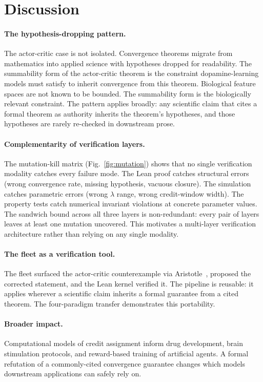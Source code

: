 \FloatBarrier
\section{Discussion}
\label{sec:discussion}

\paragraph{The hypothesis-dropping pattern.}
The actor-critic case is not isolated. Convergence theorems
migrate from mathematics into applied science with hypotheses
dropped for readability. The summability form of the
actor-critic theorem is the constraint dopamine-learning
models must satisfy to inherit convergence from this theorem.
Biological feature spaces are not known to be bounded.
The summability form is the biologically relevant constraint. The
pattern applies broadly: any scientific claim that cites a
formal theorem as authority inherits the theorem's hypotheses,
and those hypotheses are rarely re-checked in downstream prose.

\paragraph{Complementarity of verification layers.}
The mutation-kill matrix (Fig.~\ref{fig:mutation}) shows that no
single verification modality catches every failure mode. The Lean
proof catches structural errors (wrong convergence rate, missing
hypothesis, vacuous closure). The simulation catches parametric
errors (wrong $\lambda$ range, wrong credit-window width). The
property tests catch numerical invariant violations at concrete
parameter values. The sandwich bound across all three layers is
non-redundant: every pair of layers leaves at least one mutation
uncovered. This motivates a multi-layer verification architecture
rather than relying on any single modality.

\paragraph{The \sys{} fleet as a verification tool.}
The fleet surfaced the actor-critic counterexample via
Aristotle~\citep{achim2025aristotle}, \sys{} proposed the corrected
statement, and the Lean kernel verified it.
The pipeline is reusable: it applies wherever a scientific claim
inherits a formal guarantee from a cited theorem. The four-paradigm
transfer demonstrates this portability.

\paragraph{Broader impact.}
Computational models of credit assignment inform drug development,
brain stimulation protocols, and reward-based training of artificial
agents. A formal refutation of a commonly-cited convergence guarantee
changes which models downstream applications can safely rely on.


